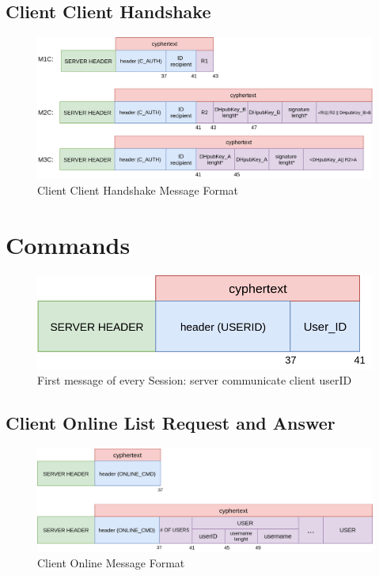 \documentclass[11pt]{report}
\begin{document}
\subsection*{Client Client Handshake}
\begin{figure}[H]
	\centering
	\includegraphics[scale=0.28]{img/AuthClientClient_messageFormat.png}
	\caption{Client Client Handshake Message Format}
	\label {img: FormatClientClient}
\end{figure}

\section{Commands}
\begin{figure}[H]
	\centering
	\includegraphics[scale=0.28]{img/SessionFirstMessageFormat.png}
	\caption{First message of every Session: server communicate client userID}
	\label {img: FormatClientServerFirst}
\end{figure}
\subsection*{Client Online List Request and Answer }
\begin{figure}[H]
	\centering
	\includegraphics[scale=0.25]{img/ClientOnline_messageFormat.png}
	\caption{Client Online Message Format}
	\label {img: FormatClientOnline}
\end{figure}
\end{document}
